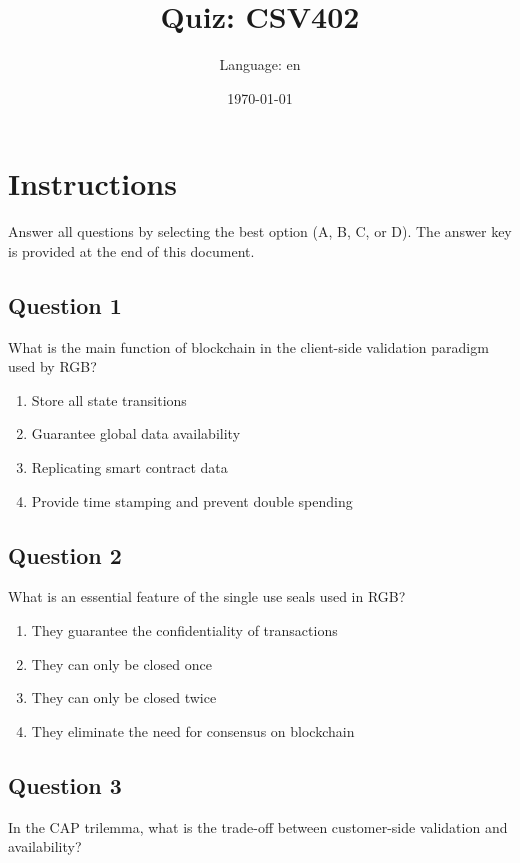 \documentclass[12pt,a4paper]{article}
\title{Quiz: CSV402}
\author{Language: en}
\date{\today}
\begin{document}
\maketitle
\thispagestyle{fancy}

\section*{Instructions}
Answer all questions by selecting the best option (A, B, C, or D). The answer key is provided at the end of this document.

\bigskip


\subsection*{Question 1}
What is the main function of blockchain in the client-side validation paradigm used by RGB?

\begin{enumerate}[label=\Alph*., leftmargin=*]
\item Store all state transitions
\item Guarantee global data availability
\item Replicating smart contract data
\item Provide time stamping and prevent double spending
\end{enumerate}

\bigskip


\subsection*{Question 2}
What is an essential feature of the single use seals used in RGB?

\begin{enumerate}[label=\Alph*., leftmargin=*]
\item They guarantee the confidentiality of transactions
\item They can only be closed once
\item They can only be closed twice
\item They eliminate the need for consensus on blockchain
\end{enumerate}

\bigskip


\subsection*{Question 3}
In the CAP trilemma, what is the trade-off between customer-side validation and availability?
\end{document}
